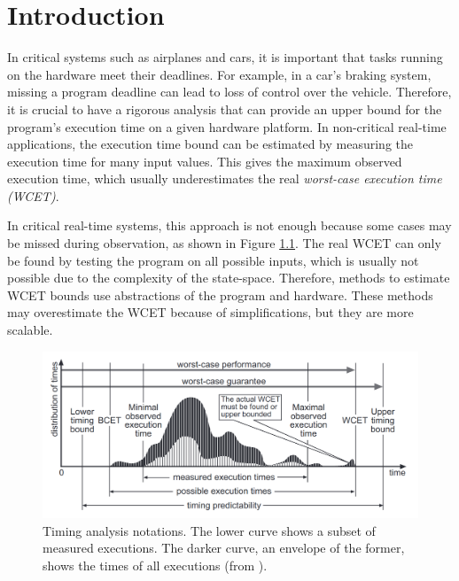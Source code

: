 \chapter{Introduction}


In critical systems such as airplanes and cars, it is important that tasks running on the hardware meet their deadlines. For example, in a car's braking system, missing a program deadline can lead to loss of control over the vehicle. Therefore, it is crucial to have a rigorous analysis that can provide an upper bound for the program's execution time on a given hardware platform. In non-critical real-time applications, the execution time bound can be estimated by measuring the execution time for many input values. This gives the maximum observed execution time, which usually underestimates the real \textit{worst-case execution time (WCET)}.

In critical real-time systems, this approach is not enough because some cases may be missed during observation, as shown in Figure \ref{fig:timing-distribution}. The real WCET can only be found by testing the program on all possible inputs, which is usually not possible due to the complexity of the state-space. Therefore, methods to estimate WCET bounds use abstractions of the program and hardware. These methods may overestimate the WCET because of simplifications, but they are more scalable.

\begin{figure}[H]
    \centering
    \includegraphics[width=\textwidth]{figures/timing-distribution.png}
    \caption{Timing analysis notations. The lower curve shows a subset of measured executions. The darker curve, an envelope of the former, shows the times of all executions (from \cite{ferdinand_worst_2004}).}
    \label{fig:timing-distribution}
\end{figure}

